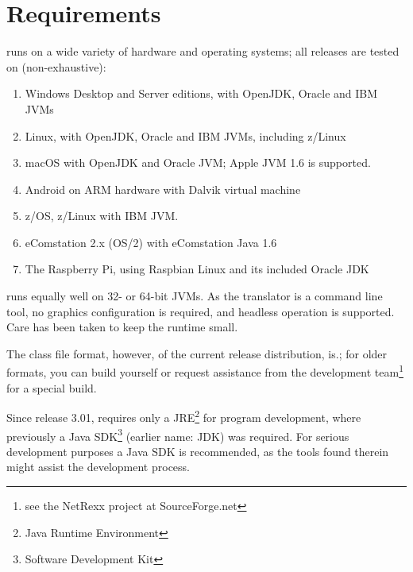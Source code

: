 \chapter{Requirements}
\nr{}  runs on a wide variety of
hardware and operating systems; all releases are tested on (non-exhaustive):
\begin{enumerate}
\item Windows Desktop and Server editions, with OpenJDK, Oracle and IBM JVMs
\item Linux, with OpenJDK, Oracle and IBM JVMs, including z/Linux
\item macOS with OpenJDK and Oracle JVM; Apple JVM 1.6 is supported.
\item Android on ARM hardware with Dalvik virtual machine
\item z/OS, z/Linux with IBM JVM.
\item eComstation 2.x (OS/2) with eComstation Java 1.6
\item The Raspberry Pi, using Raspbian Linux and its included Oracle JDK
\end{enumerate}
\nr{} runs equally well on 32- or 64-bit JVMs. As the translator is
a command line tool, no graphics configuration is required, and
headless operation is supported. Care has been taken to keep the \nr{} runtime small.

The class file format, however, of the current release distribution, is.; for older formats, you
can build \nr{} yourself or request assistance from the development
team\footnote{see the NetRexx project at SourceForge.net} for a special build.
\begin{shaded}\noindent
Since release 3.01, \nr{} requires only a
JRE\footnote{Java Runtime Environment} for program development, where previously a
Java SDK\footnote{Software Development Kit} (earlier name: JDK) was required. For serious development
purposes a Java SDK is recommended, as the tools found therein might
assist the development process.
\end{shaded}\indent
